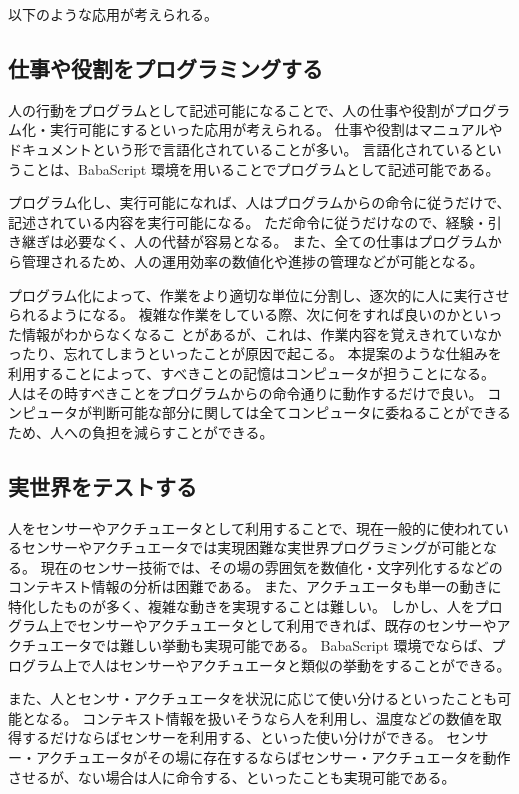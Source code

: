 以下のような応用が考えられる。

\subsection{仕事や役割をプログラミングする}\label{ux4ed5ux4e8bux3084ux5f79ux5272ux3092ux30d7ux30edux30b0ux30e9ux30dfux30f3ux30b0ux3059ux308b}

人の行動をプログラムとして記述可能になることで、人の仕事や役割がプログラム化・実行可能にするといった応用が考えられる。
仕事や役割はマニュアルやドキュメントという形で言語化されていることが多い。
言語化されているということは、BabaScript
環境を用いることでプログラムとして記述可能である。

プログラム化し、実行可能になれば、人はプログラムからの命令に従うだけで、記述されている内容を実行可能になる。
ただ命令に従うだけなので、経験・引き継ぎは必要なく、人の代替が容易となる。
また、全ての仕事はプログラムから管理されるため、人の運用効率の数値化や進捗の管理などが可能となる。

プログラム化によって、作業をより適切な単位に分割し、逐次的に人に実行させられるようになる。
複雑な作業をしている際、次に何をすれば良いのかといった情報がわからなくなるこ
とがあるが、これは、作業内容を覚えきれていなかったり、忘れてしまうといったことが原因で起こる。
本提案のような仕組みを利用することによって、すべきことの記憶はコンピュータが担うことになる。
人はその時すべきことをプログラムからの命令通りに動作するだけで良い。
コンピュータが判断可能な部分に関しては全てコンピュータに委ねることができるため、人への負担を減らすことができる。

\subsection{実世界をテストする}\label{ux5b9fux4e16ux754cux3092ux30c6ux30b9ux30c8ux3059ux308b}

人をセンサーやアクチュエータとして利用することで、現在一般的に使われているセンサーやアクチュエータでは実現困難な実世界プログラミングが可能となる。
現在のセンサー技術では、その場の雰囲気を数値化・文字列化するなどのコンテキスト情報の分析は困難である。
また、アクチュエータも単一の動きに特化したものが多く、複雑な動きを実現することは難しい。
しかし、人をプログラム上でセンサーやアクチュエータとして利用できれば、既存のセンサーやアクチュエータでは難しい挙動も実現可能である。
BabaScript
環境でならば、プログラム上で人はセンサーやアクチュエータと類似の挙動をすることができる。

また、人とセンサ・アクチュエータを状況に応じて使い分けるといったことも可能となる。
コンテキスト情報を扱いそうなら人を利用し、温度などの数値を取得するだけならばセンサーを利用する、といった使い分けができる。
センサー・アクチュエータがその場に存在するならばセンサー・アクチュエータを動作させるが、ない場合は人に命令する、といったことも実現可能である。

